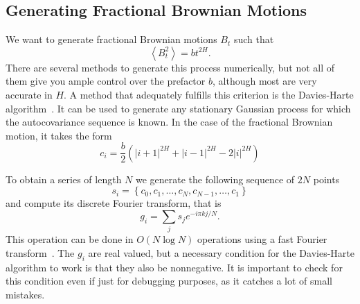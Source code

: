 \subsection{Generating Fractional Brownian Motions}
\label{sec:fbm}

We want to generate fractional Brownian motions $B_t$ such that
\begin{equation}
    \label{eq:fbm}
    \left\langle B_t^2 \right\rangle = bt^{2H}.
\end{equation}
There are several methods to generate this process numerically, but not all of
them give you ample control over the prefactor $b$, although most are very
accurate in $H$. A method that adequately fulfills this criterion is the
Davies-Harte algorithm~\cite{Davies1987}. It can be used to generate any
stationary Gaussian process for which the autocovariance sequence is known. In
the case of the fractional Brownian motion, it takes the form
\begin{equation}
    c_i = \frac{b}{2} \left(
            \left|i+1\right|^{2H} +
            \left|i-1\right|^{2H} -
            2\left|i\right|^{2H}
          \right)
\end{equation}

To obtain a series of length $N$ we generate the following sequence of $2N$
points
\begin{equation}
    s_i=\left\{c_{0},c_{1},\ldots,c_{N},c_{N-1},\ldots,c_{1}\right\}
\end{equation}
and compute its discrete Fourier transform, that is
\begin{equation}
    g_{i}=\sum_{j}s_{j}e^{-i\pi kj/N}.
\end{equation}
This operation can be done in $O(N\log N)$ operations using a fast Fourier
transform~\cite{Frigo2002}. The $g_i$ are real valued, but a necessary condition for the
Davies-Harte algorithm to work is that they also be nonnegative. It is
important to check for this condition even if just for debugging purposes,
as it catches a lot of small mistakes.

